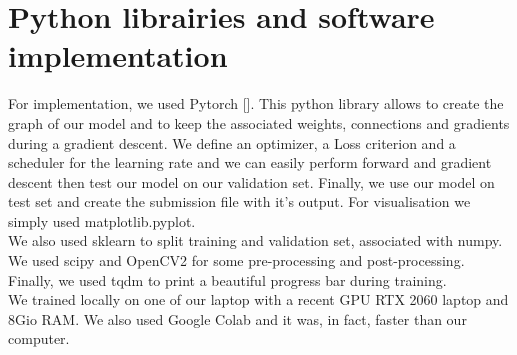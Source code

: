 \documentclass[10pt,conference,compsocconf]{IEEEtran}
\begin{document}
\section{Python librairies and software implementation}
For implementation, we used Pytorch [\cite{pytorch}]. This python library allows to create the graph of our model and to keep the associated weights, connections and gradients during a gradient descent. We define an optimizer, a Loss criterion and a scheduler for the learning rate and we can easily perform forward and gradient descent then test our model on our validation set. Finally, we use our model on test set and create the submission file with it's output.
For visualisation we simply used matplotlib.pyplot. \\
We also used sklearn to split training and validation set, associated with numpy. We used scipy and OpenCV2 for some pre-processing and post-processing. Finally, we used tqdm to print a beautiful progress bar during training. \\
We trained locally on one of our laptop with a recent GPU RTX 2060 laptop and 8Gio RAM. We also used Google Colab and it was, in fact, faster than our computer.
\end{document}
